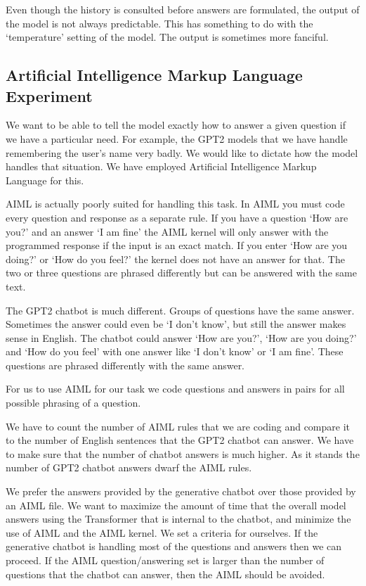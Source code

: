 Even though the history is consulted before answers are formulated, the output of the model is not always predictable. This has something to do with the `temperature' setting of the model. The output is sometimes more fanciful.


\subsection{Artificial Intelligence Markup Language Experiment}

We want to be able to tell the model exactly how to answer a given question if we have a particular need. For example, the GPT2 models that we have handle remembering the user's name very badly. We would like to dictate how the model handles that situation. We have employed Artificial Intelligence Markup Language for this. 

AIML is actually poorly suited for handling this task. In AIML you must code every question and response as a separate rule. If you have a question `How are you?' and an answer `I am fine' the AIML kernel will only answer with the programmed response if the input is an exact match. If you enter `How are you doing?' or `How do you feel?' the kernel does not have an answer for that. The two or three questions are phrased differently but can be answered with the same text.

The GPT2 chatbot is much different. Groups of questions have the same answer. Sometimes the answer could even be `I don't know', but still the answer makes sense in English. The chatbot could answer `How are you?', `How are you doing?' and `How do you feel' with one answer like `I don't know' or `I am fine'. These questions are phrased differently with the same answer.

For us to use AIML for our task we code questions and answers in pairs for all possible phrasing of a question.

We have to count the number of AIML rules that we are coding and compare it to the number of English sentences that the GPT2 chatbot can answer. We have to make sure that the number of chatbot answers is much higher. As it stands the number of GPT2 chatbot answers dwarf the AIML rules.

We prefer the answers provided by the generative chatbot over those provided by an AIML file. We want to maximize the amount of time that the overall model answers using the Transformer that is internal to the chatbot, and minimize the use of AIML and the AIML kernel. We set a criteria for ourselves. If the generative chatbot is handling most of the questions and answers then we can proceed. If the AIML question/answering set is larger than the number of questions that the chatbot can answer, then the AIML should be avoided. 

